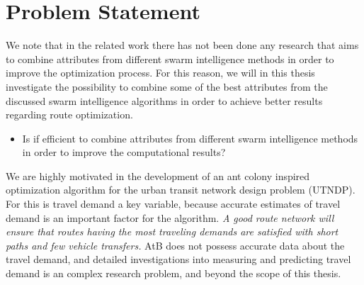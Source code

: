 \section{Problem Statement} 

We note that in the related work there has not been done any research that aims to combine attributes from different swarm intelligence methods in order to improve the optimization process. For this reason, we will in this thesis investigate the possibility to combine some of the best attributes from the discussed swarm intelligence algorithms in order to achieve better results regarding route optimization. 
\begin{itemize}
\item Is if efficient to combine attributes from different swarm intelligence methods in order to improve the computational results?
\end{itemize}

We are highly motivated in the development of an ant colony inspired optimization algorithm for the urban transit network design problem (UTNDP). For this is travel demand a key variable, because accurate estimates of travel demand is an important factor for the algorithm.\emph{\color{red} A good route network will ensure that routes having the most traveling demands are satisfied with short paths and few vehicle transfers.} AtB does not possess accurate data about the travel demand, and detailed investigations into measuring and predicting travel demand is an complex research problem, and beyond the scope of this thesis. 

